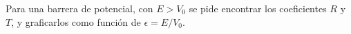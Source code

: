 \documentclass[../main.tex]{subfiles}
\begin{document}
\begin{problema}
	Para una barrera de potencial, con \(E > V_{0}\) se pide encontrar
	los coeficientes \(R\) y \(T\), y graficarlos como función
	de \(\epsilon = E/V_{0}\).
\end{problema}
\end{document}
